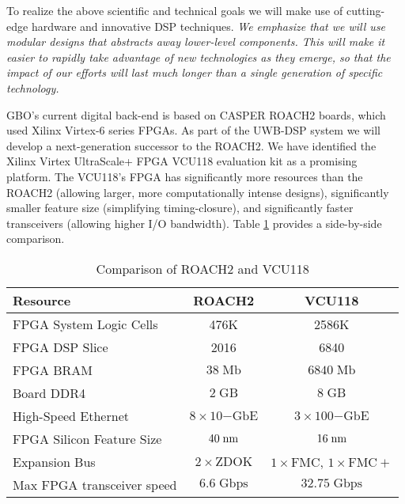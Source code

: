 \documentclass[10pt]{myNSF}
\begin{document}
To realize the above scientific and technical goals we will make use
of cutting-edge hardware and innovative DSP techniques.  \emph{We
  emphasize that we will use modular designs that abstracts away
  lower-level components.  This will make it easier to rapidly take
  advantage of new technologies as they emerge, so that the impact of
  our efforts will last much longer than a single generation of
  specific technology.}


 GBO's current digital back-end is based on
CASPER ROACH2 boards, which used Xilinx Virtex-6 series FPGAs.  As
part of the UWB-DSP system we will develop a next-generation successor
to the ROACH2.  We have identified the Xilinx Virtex UltraScale+ FPGA
VCU118 evaluation kit as a promising platform.  The VCU118’s FPGA has
significantly more resources than the ROACH2 (allowing larger, more
computationally intense designs), significantly smaller feature size
(simplifying timing-closure), and significantly faster transceivers
(allowing higher I/O bandwidth).  Table \ref{table:fpga} provides a
side-by-side comparison.

\begin{table}[h]
  \centering
  \caption{Comparison of ROACH2 and VCU118 \label{table:fpga}}
  \begin{tabular}{|l|c|c|}
    \hline
    Resource & ROACH2 & VCU118 \\
    \hline
    FPGA System Logic Cells & 476K & 2586K \\
    FPGA DSP Slice & 2016 & 6840 \\
    FPGA BRAM & $38\; \mathrm{Mb}$ & $6840\; \mathrm{Mb}$ \\
    Board DDR4 & $2\; \mathrm{GB}$ & $8\; \mathrm{GB}$ \\
    High-Speed Ethernet & $8 \times 10\mathrm{-GbE}$ & $3 \times 100\mathrm{-GbE}$ \\
    FPGA Silicon Feature Size & $40\; \textrm{nm}$ & $16\; \textrm{nm}$ \\
    Expansion Bus & $2 \times \mathrm{ZDOK}$ & $1 \times \mathrm{FMC}$, $1 \times \mathrm{FMC}+$ \\
    Max FPGA transceiver speed & $6.6\; \mathrm{Gbps}$ & $32.75\; \mathrm{Gbps}$ \\
    \hline
  \end{tabular}
\end{table}
\end{document}
